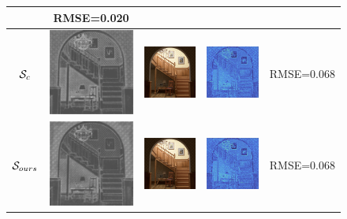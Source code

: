 \documentclass{classeENS}
\begin{document}
\begin{figure}[H]
\begin{tabular}{|c|ccc|c|}
    & RMSE=0.020 \\
    \hline
    $\mathcal S_{c}$  
    & \includegraphics[width=30mm]{image/final2/smDARS.png}
    & \includegraphics[width=30mm]{image/final2/dars.png}
    & \includegraphics[width=30mm]{image/final2/errorDARS.png} 
    & RMSE=0.068 \\
    \hline
    $\mathcal S_{ours}$ 
    & \includegraphics[width=30mm]{image/final2/smMy.png}
    & \includegraphics[width=30mm]{image/final2/my.png}
    & \includegraphics[width=30mm]{image/final2/errorMy.png} 
    & RMSE=0.068 \\
    \hline
\end{tabular}
\end{figure}
\end{document}
